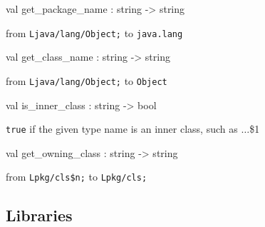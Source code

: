 \documentclass[11pt]{article}
\begin{document}
\label{val:Java.get-underscorepackage-underscorename}\begin{ocamldoccode}
val get_package_name : string -> string
\end{ocamldoccode}
\begin{ocamldocdescription}
from {\tt{Ljava/lang/Object;}} to {\tt{java.lang}}


\end{ocamldocdescription}




\label{val:Java.get-underscoreclass-underscorename}\begin{ocamldoccode}
val get_class_name : string -> string
\end{ocamldoccode}
\begin{ocamldocdescription}
from {\tt{Ljava/lang/Object;}} to {\tt{Object}}


\end{ocamldocdescription}




\label{val:Java.is-underscoreinner-underscoreclass}\begin{ocamldoccode}
val is_inner_class : string -> bool
\end{ocamldoccode}
\begin{ocamldocdescription}
{\tt{true}} if the given type name is an inner class, such as $\ldots$\$1


\end{ocamldocdescription}




\label{val:Java.get-underscoreowning-underscoreclass}\begin{ocamldoccode}
val get_owning_class : string -> string
\end{ocamldoccode}
\begin{ocamldocdescription}
from {\tt{Lpkg/cls\$n;}} to {\tt{Lpkg/cls;}}


\end{ocamldocdescription}




\subsection{Libraries}
\end{document}
